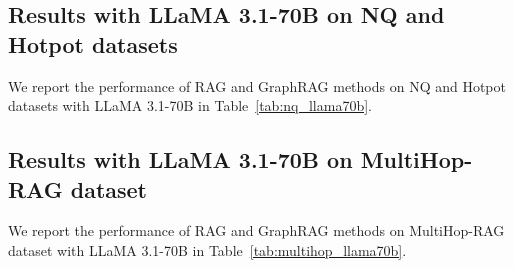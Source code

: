 \begin{table}[htb]
\caption{Performance comparison (\%) on the MultiHop-RAG dataset using \textbf{Llama 3.1-70B}.}
\label{tab:multihop_llama70b}
\centering
{}
\end{table}

\subsection{Results with LLaMA 3.1-70B on NQ and Hotpot datasets}

We report the performance of RAG and GraphRAG methods on NQ and Hotpot datasets with LLaMA 3.1-70B in Table~\ref{tab:nq_llama70b}.

\subsection{Results with LLaMA 3.1-70B on MultiHop-RAG dataset}

We report the performance of RAG and GraphRAG methods on MultiHop-RAG dataset with LLaMA 3.1-70B in Table~\ref{tab:multihop_llama70b}.

